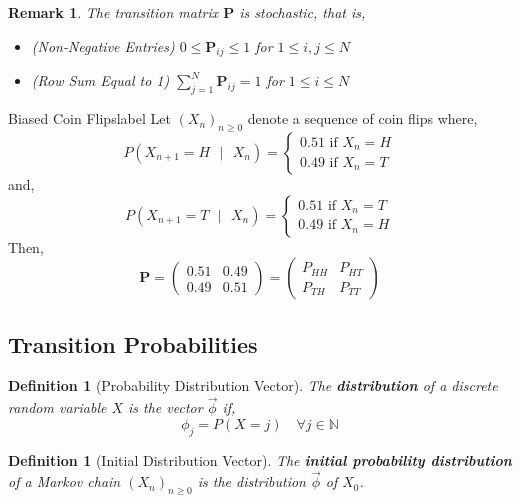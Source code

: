\documentclass{tufte-handout}
\newtheorem{defn}[thm]{Definition}
\newtheorem{rmk}[thm]{Remark}
\begin{document}
  \begin{rmk}
     The transition matrix $\boldsymbol{P}$ is stochastic, that is,
      \begin{itemize}
        \item (Non-Negative Entries) $0 \leq \boldsymbol{P}_{ij} \leq 1$ for $1 \leq i,j \leq N$
        \item (Row Sum Equal to 1) $\sum_{j=1}^N \boldsymbol{P}_{ij} = 1$ for $1 \leq i \leq N$
      \end{itemize}
  \end{rmk}


  \begin{ex}{Biased Coin Flips}{label}
  Let $(X_n)_{n \geq 0}$ denote a sequence of coin flips where,
    \[P(X_{n+1} = H \text{ $|$ } X_n) = 
    \begin{cases}
        0.51 \text{ if  } X_n = H\\
        0.49 \text{ if } X_n  = T
    \end{cases}
    \]
    \noindent and,
    \[
    P(X_{n+1} = T \text{ $|$ } X_n) = 
    \begin{cases}
        0.51 \text{ if  }X_n = T\\
        0.49 \text{ if }X_n = H
    \end{cases}
    \]
    Then,
    \[\boldsymbol{P} = \begin{pmatrix}
    0.51 & 0.49\\ 0.49 & 0.51
    \end{pmatrix}  = \begin{pmatrix}
    P_{HH} & P_{HT}\\
    P_{TH} & P_{TT}
    \end{pmatrix} \]
  \end{ex}

  \subsection{Transition Probabilities}
  \begin{defn}[Probability Distribution Vector]
    The \textbf{distribution} of a discrete random variable $X$ is the vector $\Vec{\phi}$ if,
    \[\phi_{j} = P(X = j) \quad \text{$\forall j \in \mathbb{N}$}\]
  \end{defn}

  \begin{defn}[Initial Distribution Vector]
    The \textbf{initial probability distribution} of a Markov chain $(X_n)_{n \geq 0}$ is the distribution $\Vec{\phi}$ of $X_0$.
  \end{defn}
\end{document}
